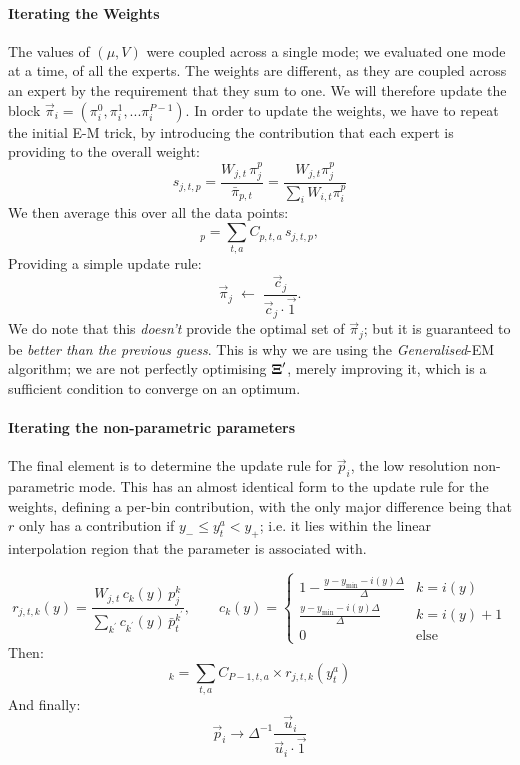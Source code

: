 		\paragraph{Iterating the Weights} The values of $(\mu, V)$ were coupled across a single mode; we evaluated one mode at a time, of all the experts. The weights are different, as they are coupled across an expert by the requirement that they sum to one. We will therefore update the block $\vec{\pi}_i = \left(\pi_i^0, \pi_i^1, ... \pi_i^{P-1} \right)$. In order to update the weights, we have to repeat the initial E-M trick, by introducing the contribution that each expert is providing to the overall weight:
		\begin{equation}
			s_{j,t,p} = \frac{W_{j,t}\,\pi_{j}^p}{\bar\pi_{p,t}} = \frac{W_{j,t} \pi_j^p}{\sum_i W_{i,t} \pi_i^p}
		\end{equation}
		We then average this over all the data points:
		\begin{equation}
			[\vec{c}_{j}]_p = \sum_{t,a}C_{p,t,a}\,s_{j,t,p},
		\end{equation}
		Providing a simple update rule:
		\begin{equation}
			\vec{\pi}_{j} \;\leftarrow\; \frac{\vec{c}_{j}}{ \vec{c}_{j} \cdot \vec{1}}.
		\end{equation}
		We do note that this \textit{doesn't} provide the optimal set of $\vec{\pi}_j$; but it is guaranteed to be \textit{better than the previous guess}. This is why we are using the \textit{Generalised}-EM algorithm; we are not perfectly optimising $\mathbf{\boldsymbol{\mathrm{\Xi}}}^\prime$, merely improving it, which is a sufficient condition to converge on an optimum.

		\paragraph{Iterating the non-parametric parameters} The final element is to determine the update rule for $\vec{p}_i$, the low resolution non-parametric mode. This has an almost identical form to the update rule for the weights, defining a per-bin contribution, with the only major difference being that $r$ only has a contribution if $y_- \leq y_t^a < y_+$; i.e. it lies within the linear interpolation region that the parameter is associated with.

		\begin{equation}
			r_{j,t,k}(y) = \frac{W_{j,t}\,c_k(y)\,p_j^k}{\sum_{k^\prime} c_{k^\prime}(y)\,\bar p^{k^\prime}_t}, \qquad c_k(y) = \begin{cases}1-\frac{y-y_\text{min}-i(y)\Delta}{\Delta} & k=i(y)\\ \frac{y-y_\text{min}-i(y)\Delta}{\Delta} & k=i(y)+1\\ 0 &\text{else}\end{cases}
		\end{equation}
		Then:
		\begin{equation}
			[\vec{u}_j]_k =  \sum_{t,a} C_{{P-1},t,a} \times r_{j,t,k} (y_t^a)
		\end{equation}
		And finally:
		\begin{equation}
			\vec{p}_i \to \Delta^{-1} \frac{\vec{u}_i}{\vec{u}_i \cdot \vec{1}}
		\end{equation}

